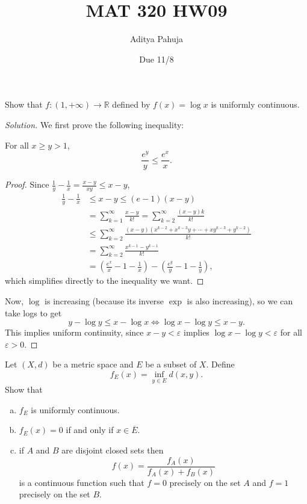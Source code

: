 \documentclass[11pt]{scrartcl}
\title{\vspace{-2em}MAT 320 HW09}
\author{\large Aditya Pahuja}
\date{\large Due 11/8}
\providecommand{\ol}{\overline}
\providecommand{\eps}{\varepsilon}
\providecommand{\RR}{\mathbb R}
\providecommand{\ii}{\item}
\newenvironment{soln}{\begin{proof}[Solution]}{\end{proof}}
\begin{document}
\maketitle

\begin{problem}
	Show that $f\colon(1,+\infty)\to\RR$ defined by $f(x) = \log x$
	is uniformly continuous.
\end{problem}

\begin{soln}
	We first prove the following inequality:
	
	\begin{claim}
		For all $x\ge y > 1$,
		\[\frac{e^y}{y} \le \frac{e^x}{x}.\]
	\end{claim}
	\begin{proof}
		Since $\frac{1}{y} - \frac1x = \frac{x-y}{xy} \le x - y$,
		\begin{align*}
			\frac{1}{y} - \frac{1}{x} &\le x - y \le (e-1)(x - y)\\
			&= \sum_{k=1}^\infty \frac{x-y}{k!}
			= \sum_{k=2}^\infty \frac{(x - y)k}{k!}\\
			&\le \sum_{k=2}^\infty
			\frac{(x - y)(x^{k-2} + x^{k-3}y + \cdots + xy^{k-3} + y^{k-2})}{k!}
			\\ &= \sum_{k=2}^\infty \frac{x^{k-1} - y^{k-1}}{k!}\\
			&= \left(\frac{e^x}{x} - 1 - \frac 1x\right) -
			\left(\frac{e^y}{y} - 1 - \frac 1y\right),
		\end{align*}
		which simplifies directly to the inequality we want.
	\end{proof}
	
	Now, $\log$ is increasing
	(because its inverse $\exp$ is also increasing),
	so we can take logs to get
	\[y - \log y \le x - \log x
	\iff \log x - \log y \le x - y.\]
	This implies uniform continuity,
	since $x - y < \eps$ implies $\log x - \log y < \eps$
	for all $\eps > 0$.
\end{soln}

\pagebreak
\begin{problem}
	Let $(X, d)$ be a metric space and $E$ be a subset of $X$. Define
	\[f_E(x) = \inf_{y\in E} d(x, y).\]
	Show that
	\begin{enumerate}[(a)]
		\ii $f_E$ is uniformly continuous.
		\ii $f_E(x) = 0$ if and only if $x\in\ol E$.
		\ii if $A$ and $B$ are disjoint closed sets then
		\[f(x) = \frac{f_A(x)}{f_A(x) + f_B(x)}\]
		is a continuous function such that $f = 0$
		precisely on the set $A$ and $f = 1$ precisely on the set $B$.
	\end{enumerate}
\end{problem}
\end{document}
